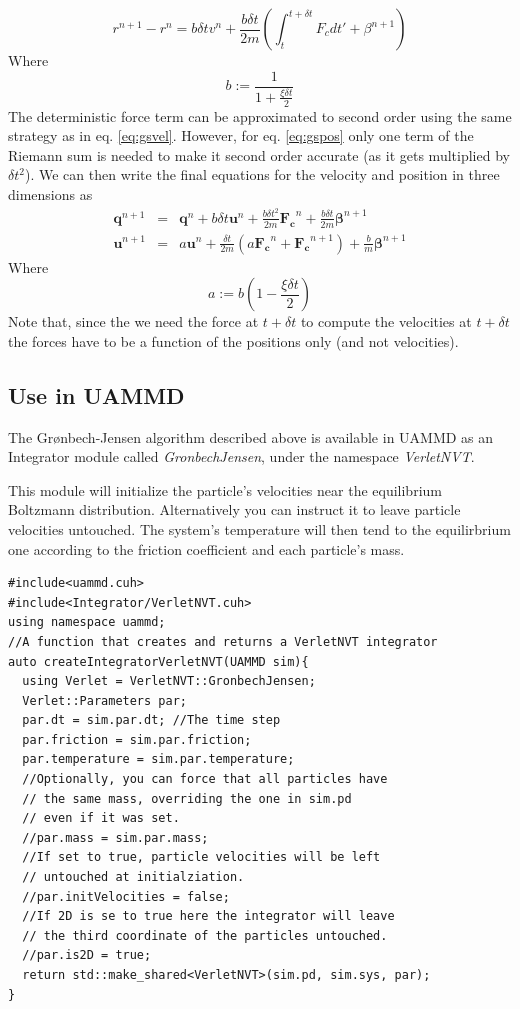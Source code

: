\documentclass[ twoside,openright,titlepage,numbers=noenddot,%
headinclude,footinclude,cleardoublepage=empty,abstract=on,
BCOR=5mm,paper=a4,fontsize=11pt, dvipsnames
]{scrreprt}
\def\ucpp{uammd_cpp_lexer.py:UAMMDCppLexer -x}
\renewcommand{\vec}[1]{\bm{#1}}
\newcommand{\uammd}{\gls{UAMMD}\xspace}
\newcommand{\dt}{\delta t}
\newcommand{\ppos}{q}
\newcommand{\pvel}{u}
\begin{document}
\begin{equation}
  \label{eq:gspos}
  r^{n+1} - r^n =  b \dt v^n + \frac{b\dt}{2m}\left(\int_t^{t+\dt}F_cdt' + \beta^{n+1}\right)
\end{equation}
Where
\begin{equation}
b := \frac{1}{1+\frac{\xi\dt}{2}}
\end{equation}
The deterministic force term can be approximated to second order using the same strategy as in eq. \eqref{eq:gsvel}. However, for eq. \eqref{eq:gspos} only one term of the Riemann sum is needed to make it second order accurate (as it gets multiplied by $\dt^2$). We can then write the final equations for the velocity and position in three dimensions as
\begin{eqnarray}
  \label{eq:gsfinal}
  \vec{\ppos}^{n+1}  &=&  \vec{\ppos}^n + b \dt \vec{\pvel}^n + \frac{b\dt^2}{2m}\vec{F_c}^n + \frac{b\dt}{2m}\vec{\beta}^{n+1}\\
  \vec{\pvel}^{n+1} &=& a\vec{\pvel}^n + \frac{\dt}{2m}\left(a\vec{F_c}^n + \vec{F_c} ^{n+1}\right) +  \frac{b}{m}\vec{\beta}^{n+1}
\end{eqnarray}
Where
\begin{equation}
  a:=b \left(1-\frac{\xi\dt}{2}\right)
\end{equation}
Note that, since the we need the force at $t+\dt$ to compute the velocities at $t+\dt$ the forces have to be a function of the positions only (and not velocities).

\subsection*{Use in UAMMD}
The Grønbech-Jensen algorithm described above is available in \uammd as an Integrator module called \emph{GronbechJensen}, under the namespace \emph{VerletNVT}.

This module will initialize the particle's velocities near the equilibrium Boltzmann distribution.
Alternatively you can instruct it to leave particle velocities untouched. The system's temperature will then tend to the equilirbrium one according to the friction coefficient and each particle's mass.

\begin{verbatim}
#include<uammd.cuh>
#include<Integrator/VerletNVT.cuh>
using namespace uammd;
//A function that creates and returns a VerletNVT integrator
auto createIntegratorVerletNVT(UAMMD sim){
  using Verlet = VerletNVT::GronbechJensen;
  Verlet::Parameters par;
  par.dt = sim.par.dt; //The time step
  par.friction = sim.par.friction;
  par.temperature = sim.par.temperature; 
  //Optionally, you can force that all particles have
  // the same mass, overriding the one in sim.pd
  // even if it was set.
  //par.mass = sim.par.mass;
  //If set to true, particle velocities will be left
  // untouched at initialziation.
  //par.initVelocities = false;
  //If 2D is se to true here the integrator will leave
  // the third coordinate of the particles untouched.
  //par.is2D = true;
  return std::make_shared<VerletNVT>(sim.pd, sim.sys, par);
}
\end{verbatim}
\end{document}
